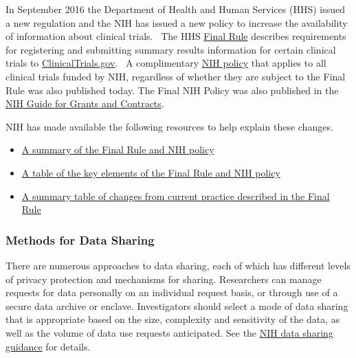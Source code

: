 \documentclass[]{book}
\begin{document}
In September 2016 the Department of Health and Human Services (HHS)
issued a new regulation and the NIH has issued a new policy to increase
the availability of information about clinical trials.~ The HHS
\href{https://www.federalregister.gov/documents/2016/09/21/2016-22129/clinical-trials-registration-and-results-information-submission}{Final
Rule} describes requirements for registering and submitting summary
results information for certain clinical trials to
\href{file:///C:/Users/elainebergman/AppData/Local/Microsoft/Windows/Temporary\%20Internet\%20Files/Content.Outlook/SJPDZYVY/ClinicalTrials.gov}{ClinicalTrials.gov}.~
A complimentary
\href{https://www.federalregister.gov/documents/2016/09/21/2016-22379/dissemination-of-nih-funded-clinical-trial-information}{NIH
policy} that applies to all clinical trials funded by NIH, regardless of
whether they are subject to the Final Rule was also published today. The
Final NIH Policy was also published in the
\href{http://grants.nih.gov/grants/guide/notice-files/NOT-OD-16-149.html}{NIH
Guide for Grants and Contracts}.

NIH has made available the following resources to help explain these
changes.~

\begin{itemize}
\item
  \href{https://www.nih.gov/news-events/summary-hhs-nih-initiatives-enhance-availability-clinical-trial-information}{A
  summary of the Final Rule and NIH policy}
\item
  \href{https://www.nih.gov/news-events/summary-table-hhs-nih-initiatives-enhance-availability-clinical-trial-information}{A
  table of the key elements of the Final Rule and NIH policy}
\item
  \href{https://prsinfo.clinicaltrials.gov/FinalRuleChanges-16Sept2016.pdf}{A
  summary table of changes from current practice described in the Final
  Rule}
\end{itemize}

\subsubsection{Methods for Data Sharing}\label{methods-for-data-sharing}

There are numerous approaches to data sharing, each of which has
different levels of privacy protection and mechanisms for sharing.
Researchers can manage requests for data personally on an individual
request basis, or through use of a secure data archive or enclave.
Investigators should select a mode of data sharing that is appropriate
based on the size, complexity and sensitivity of the data, as well as
the volume of data use requests anticipated. See the
\href{http://grants.nih.gov/grants/policy/data_sharing/data_sharing_guidance.htm\#methods}{NIH
data sharing guidance} for details.
\end{document}
